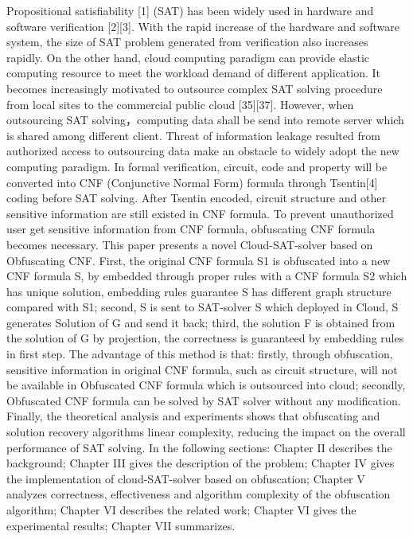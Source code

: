 \documentclass[runningheads,a4paper]{llncs}
\begin{document}
Propositional satisfiability [1] (SAT) has been widely used in hardware and software verification [2][3]. With the rapid increase of the hardware and software system, the size of SAT problem generated from verification also increases rapidly. 
On the other hand, cloud computing paradigm can provide elastic computing resource to meet the workload demand of different application. It becomes increasingly motivated to outsource complex SAT solving procedure from local sites to the commercial public cloud [35][37]. However, when outsourcing SAT solving，computing data shall be send into remote server which is shared among different client. Threat of information leakage resulted from authorized access to outsourcing data make an obstacle to widely adopt the new computing paradigm. 
In formal verification, circuit, code and property will be converted into CNF (Conjunctive Normal Form) formula through Tsentin[4] coding before SAT solving. After Tsentin encoded, circuit structure and other sensitive information are still existed in CNF formula. To prevent unauthorized user get sensitive information from CNF formula, obfuscating CNF formula becomes necessary.
This paper presents a novel Cloud-SAT-solver based on Obfuscating CNF. First, the original CNF formula S1 is obfuscated into a new CNF formula S, by embedded through proper rules with a CNF formula S2 which has unique solution, embedding rules guarantee S has different graph structure compared with S1; second, S is sent to SAT-solver S which deployed in Cloud, S generates Solution of G and send it back; third, the solution F is obtained from the solution of G by projection, the correctness is guaranteed by embedding rules in first step.
The advantage of this method is that: firstly, through obfuscation, sensitive information in original CNF formula, such as circuit structure, will not be available in Obfuscated CNF formula which is outsourced into cloud; secondly, Obfuscated CNF formula can be solved by SAT solver without any modification. Finally, the theoretical analysis and experiments shows that obfuscating and solution recovery algorithms linear complexity, reducing the impact on the overall performance of SAT solving.
In the following sections: Chapter II describes the background; Chapter III gives the description of the problem; Chapter IV gives the implementation of cloud-SAT-solver based on obfuscation; Chapter V analyzes correctness, effectiveness and algorithm complexity of the obfuscation algorithm; Chapter VI describes the related work; Chapter VI gives the experimental results; Chapter VII summarizes.
\end{document}
